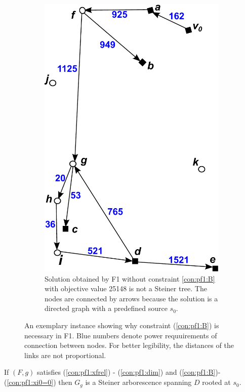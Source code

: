 \begin{figure}[!htb]
\begin{subfigure}[b]{0.4\textwidth}
        \includegraphics[width=\textwidth]{conBNec2}
        \caption{Solution obtained by F1 without constraint \ref{con:pf1:B} with objective value 25148 is not a Steiner tree.
		 The nodes are connected by arrows because the solution is a directed graph with a predefined source $s_0$.}
        \label{fig:Bpf2}
    \end{subfigure}
    \caption{An exemplary instance showing why constraint (\ref{con:pf1:B}) is necessary in F1.
		Blue numbers denote power requuirements of connection between nodes.
		For better legibility, the distances of the links are not proportional.} 
    \label{fig:BProof}
\end{figure}

\begin{prop}
\label{prop:modelcorrect}
If $(F,g)$ satisfies (\ref{con:pf1:xfrel}) - (\ref{con:pf1:dim}) and (\ref{con:pf1:B})-(\ref{con:pf1:xi0=0}) then $G_{g}$ is a Steiner arborescence spanning $D$ rooted at $s_0$.
\end{prop}
 
